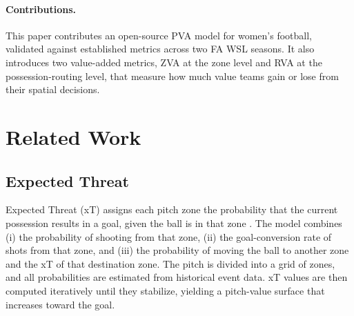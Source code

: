 \documentclass[12pt,a4paper]{article}
\begin{document}
\paragraph{Contributions.}
This paper contributes an open-source PVA model for women's football, validated against established metrics across two FA WSL seasons. It also introduces two value-added metrics, ZVA at the zone level and RVA at the possession-routing level, that measure how much value teams gain or lose from their spatial decisions.

\section{Related Work}

\subsection{Expected Threat}
Expected Threat (xT) assigns each pitch zone the probability that the current possession results in a goal, given the ball is in that zone \cite{singh_xt_2018}. The model combines (i) the probability of shooting from that zone, (ii) the goal-conversion rate of shots from that zone, and (iii) the probability of moving the ball to another zone and the xT of that destination zone. The pitch is divided into a grid of zones, and all probabilities are estimated from historical event data. xT values are then computed iteratively until they stabilize, yielding a pitch-value surface that increases toward the goal.
\end{document}

